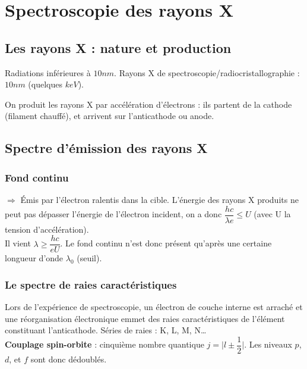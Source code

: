 \documentclass[13pt, twoside, a4paper, french, tikz]{report}
\begin{document}
\chapter{Spectroscopie des rayons X}\label{ch:spectroscopie-des-rayons-x}
  
  
  \section{Les rayons X : nature et production}\label{sec:les-rayons-x-:-nature-et-production}
    
    Radiations inférieures à $10 nm$. Rayons X de spectroscopie/radiocristallographie : $10 nm$ (quelques $keV$).
    
    On produit les rayons X par accélération d'électrons : ils partent de la cathode (filament chauffé), et arrivent sur l'anticathode ou anode.
  
  
  \section{Spectre d'émission des rayons X}\label{sec:spectre-d'emission-des-rayons-x}
    
    \subsection{Fond continu}\label{subsec:fond-continu}
      
      $\Rightarrow$ Émis par l'électron ralentis dans la cible.
      L'énergie des rayons X produits ne peut pas dépasser l'énergie de l'électron incident, on a donc $\dfrac{hc}{\lambda e} \le U$ (avec U la tension d'accélération).\\
      Il vient $\lambda \ge \dfrac{hc}{eU}$.
      Le fond continu n'est donc présent qu'après une certaine longueur d'onde $\lambda_{0}$ (seuil).
    
    \subsection{Le spectre de raies caractéristiques}\label{subsec:le-spectre-de-raies-caracteristiques}
      
      Lors de l'expérience de spectroscopie, un électron de couche interne est arraché et une réorganisation électronique emmet des raies caractéristiques de l'élément constituant l'anticathode.
      Séries de raies : K, L, M, N\ldots\\
      
      \textbf{Couplage spin-orbite} : cinquième nombre quantique $j = \bigg | l \pm \dfrac{1}{2} \bigg |$.
      Les niveaux $p$, $d$, et $f$ sont donc dédoublés.\\
      
\end{document}
